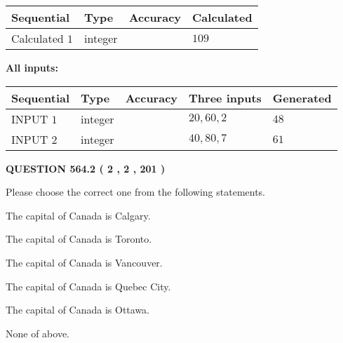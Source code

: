 \documentclass[12pt]{article}
\begin{document}
   
\noindent{}
   
   
  
  
\noindent\begin{tabular}{|l|l|l|l|}
\hline
 Sequential & Type & Accuracy & Calculated \\ 
\hline
 
 
  Calculated $  1 $ & integer &  & 
  $ 109 $ 
 \\  \hline  
 \end{tabular}
   
   
   
   
\noindent\vspace{0.1in}\hspace{-0.08in} {\textbf{\Large{All inputs: }}}
   
   
  
  
\noindent\begin{tabular}{|l|l|l|l|l|}
\hline
 Sequential & Type & Accuracy & Three inputs & Generated \\ 
\hline
 
 
  INPUT $  1 $ & integer &  & $
 20
 , 
 60
 , 
 2
 $ & $ 48 $ 
 \\  \hline  
 
 
  INPUT $  2 $ & integer &  & $
 40
 , 
 80
 , 
 7
 $ & $ 61 $ 
 \\  \hline  
 \end{tabular}
   
   
  
\vspace{0.2in}
  
{\textbf{\Large{QUESTION
564.2 
 ( 2 , 2 , 201 )
}}}
  
  
Please choose the correct one from the following statements.
 
 
The capital of Canada is Calgary.
 
 
The capital of Canada is Toronto.
 
 
The capital of Canada is Vancouver.
 
 
The capital of Canada is Quebec City.
 
 
The capital of Canada is Ottawa.
 
 
 None of above.
 
 
\noindent{}
 
\end{document}

